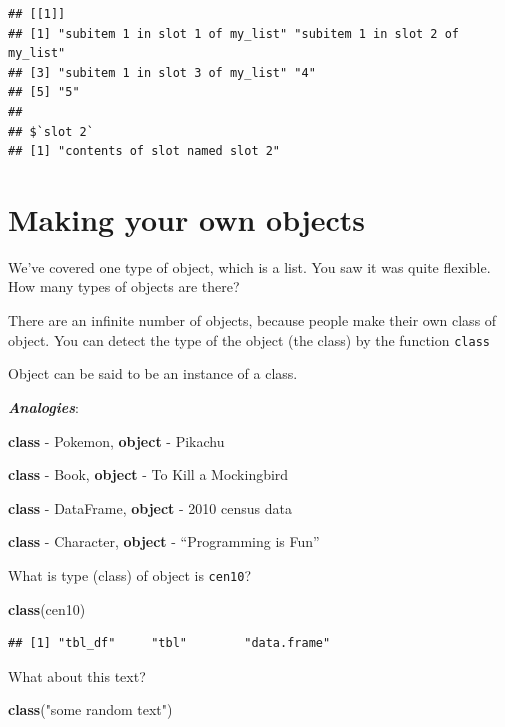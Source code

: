 \documentclass[]{book}
\newenvironment{Shaded}{\begin{snugshade}}{\end{snugshade}}
\newcommand{\KeywordTok}[1]{\textcolor[rgb]{0.13,0.29,0.53}{\textbf{#1}}}
\newcommand{\NormalTok}[1]{#1}
\newcommand{\StringTok}[1]{\textcolor[rgb]{0.31,0.60,0.02}{#1}}
\theoremstyle{definition}
\theoremstyle{definition}
\theoremstyle{definition}
\theoremstyle{remark}
\begin{document}
\begin{verbatim}
## [[1]]
## [1] "subitem 1 in slot 1 of my_list" "subitem 1 in slot 2 of my_list"
## [3] "subitem 1 in slot 3 of my_list" "4"                             
## [5] "5"                             
## 
## $`slot 2`
## [1] "contents of slot named slot 2"
\end{verbatim}

\hypertarget{making-your-own-objects}{%
\section{Making your own objects}\label{making-your-own-objects}}

We've covered one type of object, which is a list. You saw it was quite flexible. How many types of objects are there?

There are an infinite number of objects, because people make their own class of object. You can detect the type of the object (the class) by the function \texttt{class}

Object can be said to be an instance of a class.

\textbf{\emph{Analogies}}:

\textbf{class} - Pokemon, \textbf{object} - Pikachu

\textbf{class} - Book, \textbf{object} - To Kill a Mockingbird

\textbf{class} - DataFrame, \textbf{object} - 2010 census data

\textbf{class} - Character, \textbf{object} - ``Programming is Fun''

What is type (class) of object is \texttt{cen10}?

\begin{Shaded}
\begin{Highlighting}[]
\KeywordTok{class}\NormalTok{(cen10)}
\end{Highlighting}
\end{Shaded}

\begin{verbatim}
## [1] "tbl_df"     "tbl"        "data.frame"
\end{verbatim}

What about this text?

\begin{Shaded}
\begin{Highlighting}[]
\KeywordTok{class}\NormalTok{(}\StringTok{"some random text"}\NormalTok{)}
\end{Highlighting}
\end{Shaded}
\end{document}
